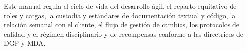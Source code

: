 \vspace{1.2cm}

\begin{infobox}[title=Propósito y Validez del Documento]
Este manual regula el ciclo de vida del desarrollo ágil, el reparto equitativo de roles y cargas, la custodia y estándares de documentación textual y código, la relación semanal con el cliente, el flujo de gestión de cambios, los protocolos de calidad y el régimen disciplinario y de recompensas conforme a las directrices de DGP y MDA.
\end{infobox}
